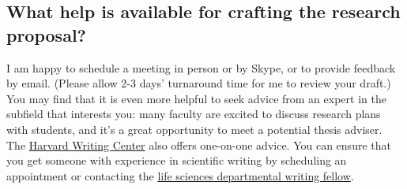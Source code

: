 \documentclass{article}
\begin{document}
\subsection*{What help is available for crafting the research proposal?}

I am happy to schedule a meeting in person or by Skype, or to provide feedback by email. (Please allow 2-3 days' turnaround time for me to review your draft.)\\

You may find that it is even more helpful to seek advice from an expert in the subfield that interests you: many faculty are excited to discuss research plans with students, and it's a great opportunity to meet a potential thesis adviser.\\

The \href{http://writingcenter.fas.harvard.edu/pages/undergraduates-0}{Harvard Writing Center} also offers one-on-one advice. You can ensure that you get someone with experience in scientific writing by scheduling an appointment or contacting the \href{http://writingcenter.fas.harvard.edu/pages/departmental-writing-fellows}{life sciences departmental writing fellow}.
\end{document}
